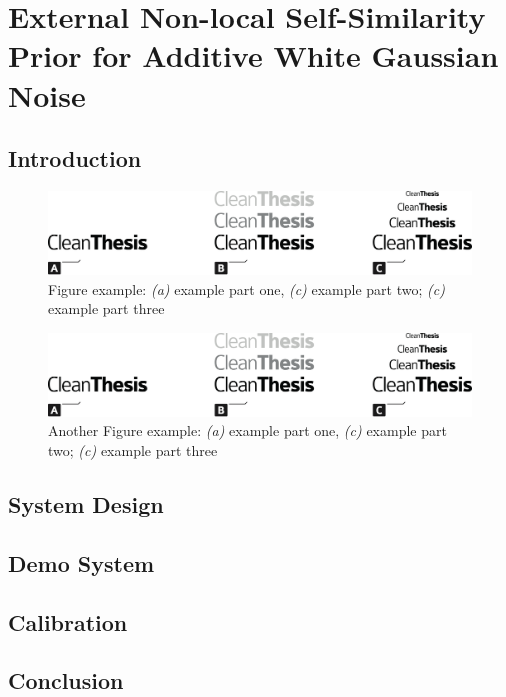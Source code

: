 %
\chapter{External Non-local Self-Similarity Prior for Additive White Gaussian Noise}
\label{sec:external}




\section{Introduction}
\label{sec:system:intro}

\begin{figure}[htb]
	\includegraphics[width=\textwidth]{gfx/Clean-Thesis-Figure}
	\caption{Figure example: \textit{(a)} example part one, \textit{(c)} example part two; \textit{(c)} example part three}
	\label{fig:system:example1}
\end{figure}

\blindtext

\blindtext

\begin{figure}[htb]
	\includegraphics[width=\textwidth]{gfx/Clean-Thesis-Figure}
	\caption{Another Figure example: \textit{(a)} example part one, \textit{(c)} example part two; \textit{(c)} example part three}
	\label{fig:system:example2}
\end{figure}

\blindtext

\section{System Design}
\label{sec:system:design}

\blindtext

\section{Demo System}
\label{sec:system:Demo}

\blindtext

\section{Calibration}
\label{sec:system:calibration}

\blindtext

\section{Conclusion}
\label{sec:system:conclusion}

\blindtext
